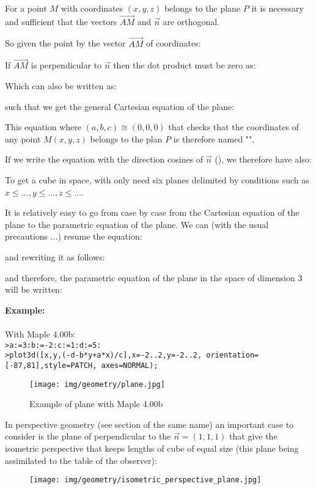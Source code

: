 	For a point $M$ with coordinates $(x, y, z)$ belongs to the plane $P$ it is necessary and sufficient that the vectors $\overrightarrow{AM}$ and $\vec{n}$ are orthogonal.
	
	So given the point by the vector $\overrightarrow{AM}$ of coordinates:
	
	If $\overrightarrow{AM}$ is perpendicular to $\vec{n}$ then the dot product must be zero as:
	
	Which can also be written as:
	
	such that we get the general Cartesian equation of the plane:
	
	This equation where $(a,b,c)\cong (0,0,0)$ that checks that the coordinates of any point $M(x,y,z)$ belongs to the plan $P$ is therefore named "".
	
	If we write the equation with the direction cosines of $\vec{n}$ (), we therefore have also:
	
	\begin{tcolorbox}[title=Remark,colframe=black,arc=10pt]
	To get a cube in space, with only need six planes delimited by conditions such as $x\leq...,y\leq...,z\leq...$.
	\end{tcolorbox}	
	It is relatively easy to go from case by case from the Cartesian equation of the plane to the parametric equation of the plane. We can (with the usual precautions ...) resume the equation:
	
	and rewriting it as follows:
	
	and therefore, the parametric equation of the plane in the space of dimension $3$ will be written:
	
	\begin{tcolorbox}[colframe=black,colback=white,sharp corners]
	\textbf{{\Large {}}Example:}\\\\
	With Maple 4.00b:\\

	\texttt{>a:=3:b:=-2:c:=1:d:=5:\\
	>plot3d([x,y,(-d-b*y+a*x)/c],x=-2..2,y=-2..2, orientation=[-87,81],style=PATCH,
axes=NORMAL);
	}
	\begin{figure}[H]
		\centering
		\texttt{[image: img/geometry/plane.jpg]}
		\caption{Example of plane with Maple 4.00b}
	\end{figure}
	\end{tcolorbox}
	In perspective geometry (see section of the same name) an important case to consider is the plane of perpendicular to the $\vec{n}=(1,1,1)$ that give the isometric perspective that keeps lengths of cube of equal size (this plane being assimilated to the table of the observer):
	\begin{figure}[H]
		\centering
		\texttt{[image: img/geometry/isometric\_perspective\_plane.jpg]}
	\end{figure}

